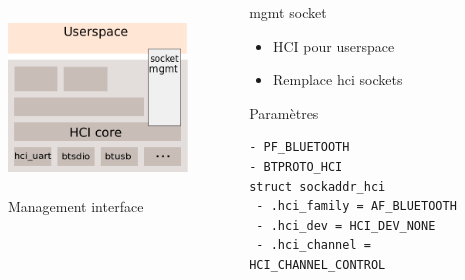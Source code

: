 \begin{frame}[fragile]
	\begin{columns}[t]
\begin{column}{0.60\linewidth}
	\begin{figure}
		\includegraphics[height=5cm]{bluez_kernel_hci_sock.png}
		\caption{Management interface}
	\end{figure}
\end{column}
\begin{column}{0.40\linewidth}
	\begin{block}{mgmt socket}
		\begin{itemize}
			\item HCI pour userspace
			\item Remplace hci sockets
		\end{itemize}
	\end{block}
	\begin{block}{Paramètres}
		\begin{Verbatim}[fontsize=\tiny]
- PF_BLUETOOTH
- BTPROTO_HCI
struct sockaddr_hci
 - .hci_family = AF_BLUETOOTH
 - .hci_dev = HCI_DEV_NONE
 - .hci_channel = HCI_CHANNEL_CONTROL
		\end{Verbatim}
	\end{block}
\end{column}
\end{columns}
\end{frame}

